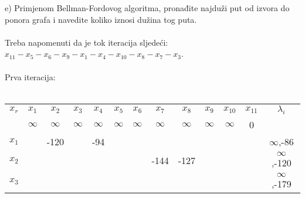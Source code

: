 \documentclass[12pt]{article}
\begin{document}
\begin{enumerate}
\newpage
e) Primjenom Bellman-Fordovog algoritma, pronađite najduži put od izvora do ponora grafa i navedite koliko iznosi dužina tog puta.
\\
\\
Treba napomenuti da je tok iteracija sljedeći: $x_{11} - x_5 - x_6 - x_9 - x_1 - x_4 - x_{10} - x_8 - x_7 - x_3$. \\
\\
Prva iteracija:
\\
\\
\begin{tabular}{|c|c|c|c|c|c|c|c|c|c|c|c|c|}
\hline
$x_r$    & $x_{1}$                         & $x_{2}$                         & $x_{3}$                         & $x_{4}$                         & $x_{5}$                         & $x_{6}$                         & $x_{7}$                         & $x_{8}$                         & $x_{9}$                         & $x_{10}$                        & $x_{11}$ & $\lambda_i$                               \\ \cline{2-12}
         & {\color[HTML]{000000} $\infty$} & {\color[HTML]{000000} $\infty$} & {\color[HTML]{000000} $\infty$} & {\color[HTML]{000000} $\infty$} & {\color[HTML]{000000} $\infty$} & {\color[HTML]{000000} $\infty$} & {\color[HTML]{000000} $\infty$} & {\color[HTML]{000000} $\infty$} & {\color[HTML]{000000} $\infty$} & {\color[HTML]{000000} $\infty$} & \color[HTML]{FE0000}0        & {\color[HTML]{000000} }                   \\ \hline
$x_{1}$  & {\color[HTML]{000000} }         & {\color[HTML]{FE0000} -120}     & {\color[HTML]{000000} }         & {\color[HTML]{FE0000} -94}      & {\color[HTML]{000000} }         & {\color[HTML]{000000} }         & {\color[HTML]{FE0000} }         & {\color[HTML]{000000} }         & {\color[HTML]{000000} }         & {\color[HTML]{000000} }         &          & {\color[HTML]{000000} $\infty$,-86}       \\ \hline
$x_{2}$  & {\color[HTML]{000000} }         & {\color[HTML]{000000} }         & {\color[HTML]{000000} }         & {\color[HTML]{000000} }         & {\color[HTML]{000000} }         & {\color[HTML]{FE0000} }         & {\color[HTML]{000000} -144}     & {\color[HTML]{000000} -127}     & {\color[HTML]{000000} }         & {\color[HTML]{000000} }         &          & {\color[HTML]{000000} $\infty$,-120}      \\ \hline
$x_{3}$  & {\color[HTML]{000000} }         & {\color[HTML]{000000} }         & {\color[HTML]{000000} }         & {\color[HTML]{000000} }         & {\color[HTML]{000000} }         & {\color[HTML]{000000} }         & {\color[HTML]{000000} }         & {\color[HTML]{FE0000} }         & {\color[HTML]{000000} }         & {\color[HTML]{000000} }         &          & {\color[HTML]{000000} $\infty$,-179}      \\ \hline

\end{tabular}
\end{enumerate}
\end{document}
